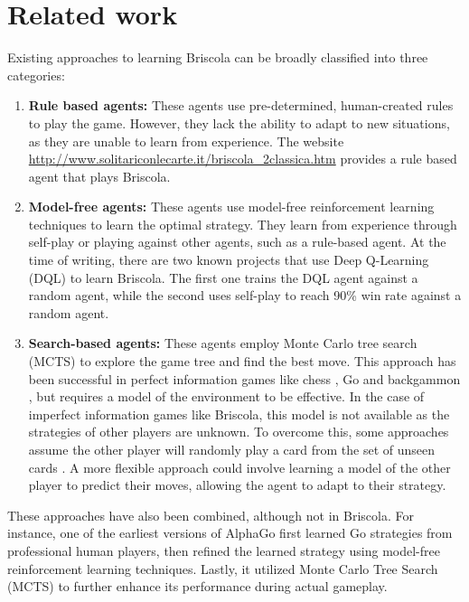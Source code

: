 \section{Related work}
Existing approaches to learning Briscola can be broadly classified into three categories:
\begin{enumerate}
    \item \textbf{Rule based agents:} These agents use pre-determined, human-created rules to play the game. However, they lack the ability to adapt to new situations, as they are unable to learn from experience. The website \url{http://www.solitariconlecarte.it/briscola_2classica.htm} provides a rule based agent that plays Briscola.
    \item \textbf{Model-free agents:} These agents use model-free reinforcement learning techniques to learn the optimal strategy. They learn from experience through self-play or playing against other agents, such as a rule-based agent. At the time of writing, there are two known projects that use Deep Q-Learning (DQL) \cite{mnih2013playing} to learn Briscola. The first one \cite{fezriva-briscola-dqn} trains the DQL agent against a random agent, while the second \cite{alsora-deep-briscola-dqn} uses self-play to reach 90\% win rate against a random agent.
    \item \textbf{Search-based agents:} These agents employ Monte Carlo tree search (MCTS) to explore the game tree and find the best move. This approach has been successful in perfect information games like chess \cite{alphazero}, Go \cite{alphagozero} and backgammon \cite{td-gammon}, but requires a model of the environment to be effective. In the case of imperfect information games like Briscola, this model is not available as the strategies of other players are unknown. To overcome this, some approaches assume the other player will randomly play a card from the set of unseen cards \cite{Briscola-mcts-Playing-Algorithm}. A more flexible approach could involve learning a model of the other player to predict their moves, allowing the agent to adapt to their strategy.
\end{enumerate}
These approaches have also been combined, although not in Briscola. For instance, one of the earliest versions of AlphaGo \cite{alphago-fan} first learned Go strategies from professional human players, then refined the learned strategy using model-free reinforcement learning techniques. Lastly, it utilized Monte Carlo Tree Search (MCTS) to further enhance its performance during actual gameplay.\\\\
